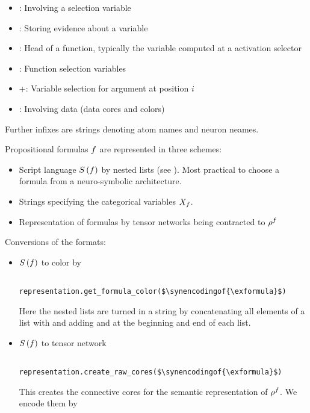 \begin{itemize}
	\item \selCoreIn: Involving a selection variable
	\item \eviCoreIn: Storing evidence about a variable
	\item \heaIn: Head of a function, typically the variable computed at a activation selector
	\item \funIn: Function selection variables
	\item \posIn+: Variable selection for argument at position $i$
	\item \datIn: Involving data (data cores and colors)
\end{itemize}

Further infixes are strings denoting atom names and neuron neames.



Propositional formulas $f$ are represented in three schemes:
\begin{itemize}
	\item Script language $S\left(f\right)$ by nested lists (see ).
		Most practical to choose a formula from a neuro-symbolic architecture.
	\item Strings specifying the categorical variables $X_{f}$.
	\item Representation of formulas by tensor networks being contracted to $\rho^{f}$
\end{itemize}

Conversions of the formats:
\begin{itemize}
	\item $S\left(f\right)$ to color by
		\begin{lstlisting}
			representation.get_formula_color($\synencodingof{\exformula}$)
		\end{lstlisting}
		Here the nested lists are turned in a string by concatenating all elements of a list with \stringof{\_} and adding \stringof{[} and \stringof{]} at the beginning and end of each list.
	\item  $S\left(f\right)$ to tensor network
		\begin{lstlisting}
			representation.create_raw_cores($\synencodingof{\exformula}$)
		\end{lstlisting}
		This creates the connective cores for the semantic representation of $\rho^{f}$.
We encode them by
\end{itemize}

